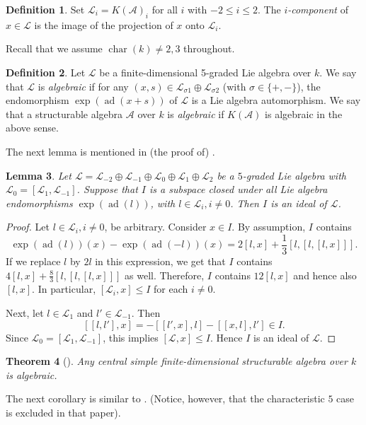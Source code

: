 \documentclass[oneside,a4paper]{amsart} %
\newtheorem{theorem}{Theorem}[section]
\newtheorem{lemma}[theorem]{Lemma}
\theoremstyle{definition}
\newtheorem{definition}[theorem]{Definition}
\DeclareMathOperator{\ad}{ad}
\DeclareMathOperator{\Char}{char}
\newcommand{\A}{\mathcal{A}}
\newcommand{\LL}{\mathcal{L}}
\newcommand{\dash}{\nobreakdash-\hspace{0pt}}
\numberwithin{equation}{section}
\begin{document}
\begin{definition}
Set $\LL_i=K(\A)_i$ for all $i$ with $-2\leq i\leq 2$. 
The \textit{$i$-component} of $x\in\LL$ is the image of the projection of $x$ onto $\LL_i$.
\end{definition}

Recall that we assume $\Char(k) \neq 2,3$ throughout.

\begin{definition}
	 Let $\LL$ be a finite-dimensional 5-graded Lie algebra over $k$. We say that $\LL$ is \textit{algebraic} if for any $(x,s) \in \LL_{\sigma 1} \oplus \LL_{\sigma 2}$ (with $\sigma \in \{ +,- \}$), the endomorphism $\exp(\ad(x+s))$ of $\LL$ is a Lie algebra automorphism. 
	 We say that a structurable algebra $\A$ over $k$ is \textit{algebraic} if $K(\A)$ is algebraic in the above sense.
\end{definition}

The next lemma is mentioned in (the proof of) \cite[Theorem 3.1(1)]{Garcia2011}.

\begin{lemma}
\label{ideals 5 grading}
	Let $\LL=\LL_{-2}\oplus \LL_{-1}\oplus \LL_0\oplus \LL_1\oplus \LL_2$ be a $5$-graded Lie algebra with $\LL_0=[\LL_1,\LL_{-1}]$. Suppose that $I$ is a subspace closed under all Lie algebra endomorphisms $\exp (\ad (l))$, with $l\in \LL_i, i\neq 0$. Then $I$ is an ideal of $\LL$.
\end{lemma}
\begin{proof}
	Let $l\in \LL_i, i\neq 0$, be arbitrary. Consider $x\in I$. By assumption, $I$ contains 
	\[ \exp(\ad (l))(x)-\exp(\ad (-l))(x)=2[l,x]+\frac 1 3 [l,[l,[l,x]]] .\]
	If we replace $l$ by $2l$ in this expression, we get that $I$ contains $4[l,x]+\frac 8 3 [l,[l,[l,x]]]$ as well. Therefore, $I$ contains $12[l,x]$ and hence also $[l,x]$. 
	In particular, $[\LL_i,x]\leq I$ for each $i\neq 0$. 
	
	Next, let $l\in \LL_1$ and $l'\in \LL_{-1}$. Then 
	 \[ [[l,l'],x]=-[[l',x],l]-[[x,l],l']\in I .\]
	Since $\LL_0=[\LL_1,\LL_{-1}]$, this implies $[\LL,x]\leq I$. 
	Hence $I$ is an ideal of $\LL$.
\end{proof}

\begin{theorem}[{\cite[Theorem 2.13, Theorem 3.4]{Stavrova2017}}]
\label{csa is algebraic}
	Any central simple finite\dash dimensional structurable algebra over $k$ is algebraic.
\end{theorem}


The next corollary is similar to \cite[Theorem 3.1.(1)]{Garcia2011}. (Notice, however, that the characteristic $5$ case is excluded in that paper).
\end{document}
